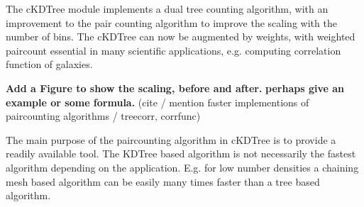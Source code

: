 The cKDTree module implements a dual tree counting algorithm\cite{pmlr-v28-curtin13},
with an improvement to the pair counting algorithm to improve the scaling
with the number of bins. The cKDTree can now be augmented by weights, with 
weighted paircount essential in many scientific applications, e.g. computing 
correlation function of galaxies\cite{0004-637X-750-1-38}.

\textbf{Add a Figure to show the scaling, before and after.}
\textbf{perhaps give an example or some formula.}
(cite / mention faster implementions of paircounting algorithms / treecorr, corrfunc)

The main purpose of the paircounting algorithm in cKDTree is to provide a readily
available tool. The KDTree based algorithm is not necessarily the fastest algorithm
depending on the application. E.g. for low number densities a chaining mesh based algorithm
can be easily many times faster than a tree based algorithm.

